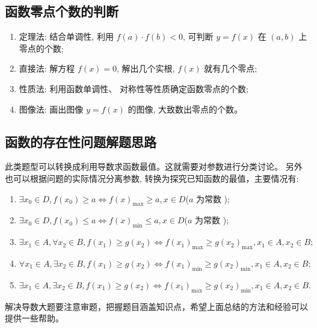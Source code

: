   \subsection{函数零点个数的判断}
    \begin{enumerate}[(1)]
      \item 定理法: 结合单调性, 利用 ${f}({a}) \cdot {f}({b})<0$, 可判断 ${y}={f}({x})$ 在 $(a, b)$ 上零点的个数; 
      \item 直接法: 解方程 ${f}({x})=0$, 解出几个实根, ${f}({x})$ 就有几个零点; 
      \item 性质法: 利用函数单调性、 对称性等性质确定函数零点的个数; 
      \item 图像法: 画出图像 ${y}={f}({x})$ 的图像, 大致数出零点的个数\cite{惠红民一题一课}。
    \end{enumerate}
  \subsection{函数的存在性问题解题思路}
    此类题型可以转换成利用导数求函数最值。这就需要对参数进行分类讨论。 另外也可以根据问题的实际情况分离参数, 转换为探究已知函数的最值\cite{惠红民一题一课}，主要情况有:
      \begin{enumerate}[(1)]
        \item $\exists x_{0} \in D, f\left(x_{0}\right) \geq a \Leftrightarrow f(x)_{\max } \geq a, x \in D$($a$ 为常数 );
        \item $\exists x_{0} \in D, f\left(x_{0}\right) \leq a \Leftrightarrow f(x)_{\min } \leq a, x \in D$($a$ 为常数 );
        \item $\exists x_{1} \in A, \forall x_{2} \in B, f\left(x_{1}\right) \geq g\left(x_{2}\right) \Leftrightarrow f\left(x_{1}\right)_{\max } \geq g\left(x_{2}\right)_{\max }, x_{1} \in A, x_{2} \in B ;$
        \item $\forall x_{1} \in A, \exists x_{2} \in B, f\left(x_{1}\right) \geq g\left(x_{2}\right) \Leftrightarrow f\left(x_{1}\right)_{\min } \geq g\left(x_{2}\right)_{\min }, x_{1} \in A, x_{2} \in B ;$
        \item $\exists x_{1} \in A, \exists x_{2} \in B, f\left(x_{1}\right) \geq g\left(x_{2}\right) \Leftrightarrow f\left(x_{1}\right)_{\max } \geq g\left(x_{2}\right)_{\min }, x_{1} \in A, x_{2} \in B .$
      \end{enumerate}
    
    解决导数大题要注意审题，把握题目涵盖知识点，希望上面总结的方法和经验可以提供一些帮助。



